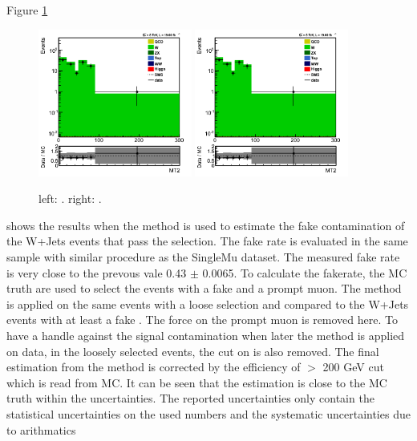 Figure \ref{fig:LepTauClusure}
\begin{figure}[!Hhtb]
\centering
\includegraphics[width=0.45\textwidth,keepaspectratio=true]{FakeRateMuTau/Estimation_pfWJets_ExtraLepExcl_SameSignWeightedHiggs.png}
\includegraphics[width=0.45\textwidth,keepaspectratio=true]{FakeRateMuTau/Estimation_pfWJets_ExtraLepExcl_SameSignWeightedHiggs.png}
\caption{left: . right: .}
\label{fig:LepTauClusure}
\end{figure}
shows the results when the method is used to estimate the fake contamination of the W+Jets events that pass the selection. 
The fake rate is evaluated in the same sample with similar procedure as the SingleMu dataset. The measured fake rate  is very close to
the prevous vale 0.43 $\pm$  0.0065. To calculate the fakerate, the MC truth are used to select the events with a fake \Tau 
and a prompt muon. The method is applied on the same events with a loose \Tau selection and compared to the W+Jets events with at least 
a fake \Tau. The force on the prompt muon is removed here. To have a handle against the signal contamination when later the method is applied 
on data, in the loosely selected events, the cut on \tauMT is also removed. The final estimation from the method is corrected by the efficiency 
of \tauMT $>$ 200 GeV cut which is read from MC. It can be seen that the estimation is close to the MC truth within the uncertainties.
The reported uncertainties only contain the statistical uncertainties on the used numbers and the systematic uncertainties due to arithmatics 
